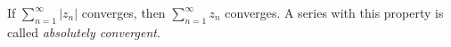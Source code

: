 If $\sum_{n=1}^{\infty} |z_n|$ converges, then $\sum_{n=1}^{\infty} z_n$ converges. A series with this property is called \textit{absolutely convergent}.
